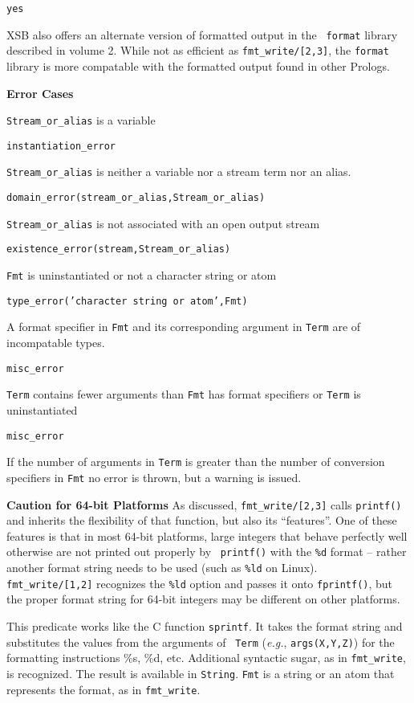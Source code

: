 \begin{description}
{\begin{verbatim}
yes
\end{verbatim}
}
%
XSB also offers an alternate version of formatted output in the {\tt
  format} library described in volume 2.  While not as efficient as
{\tt fmt\_write/[2,3]}, the {\tt format} library is more compatable
with the formatted output found in other Prologs.

{\bf Error Cases}
\bi
\item 	{\tt Stream\_or\_alias} is a variable
\bi
\item {\tt instantiation\_error}
\ei
\item 	{\tt Stream\_or\_alias} is neither a variable nor a stream term nor an alias.
\bi
\item 	{\tt domain\_error(stream\_or\_alias,Stream\_or\_alias)}
\ei
\item 	{\tt Stream\_or\_alias} is not associated with an open output stream
\bi
\item 	{\tt existence\_error(stream,Stream\_or\_alias)}
\ei
\item {\tt Fmt} is uninstantiated or not a character string or atom
\bi
\item   {\tt type\_error('character string or atom',Fmt)}
\ei
\item A format specifier in {\tt Fmt} and its corresponding argument
  in {\tt Term} are of incompatable types.
\bi
\item   {\tt misc\_error}
\ei
\item {\tt Term} contains fewer arguments than {\tt Fmt} has format
  specifiers or {\tt Term} is uninstantiated
\bi
\item   {\tt misc\_error}
\ei
\ei

If the number of arguments in {\tt Term} is greater than the number of
conversion specifiers in {\tt Fmt} no error is thrown, but a warning
is issued.

{\bf Caution for 64-bit Platforms}
%
As discussed, {\tt fmt\_write/[2,3]} calls {\tt printf()} and inherits
the flexibility of that function, but also its ``features''.  One of
these features is that in most 64-bit platforms, large integers that
behave perfectly well otherwise are not printed out properly by {\tt
  printf()} with the {\tt \%d} format -- rather another format string
needs to be used (such as {\tt \%ld} on Linux).  {\tt
  fmt\_write/[1,2]} recognizes the {\tt \%ld} option and passes it
onto {\tt fprintf()}, but the proper format string for 64-bit integers
may be different on other platforms.

    This predicate works like the C function {\tt sprintf}. It takes the
    format string and substitutes the values from the arguments of {\tt
      Term} ({\it e.g.}, {\tt args(X,Y,Z)}) for the formatting instructions
    \%s, \%d, etc. Additional syntactic sugar, as in \verb|fmt_write|, is
    recognized. The result is available in {\tt String}. {\tt Fmt} is a
    string or an atom that represents the format, as in
    {\tt fmt\_write}.
    

\end{description}
